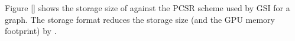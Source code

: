 %

Figure \ref{} shows the storage size of \SystemName against the PCSR scheme used by GSI for a  graph. The \SystemName storage
format reduces the storage size (and the GPU memory footprint) by .

